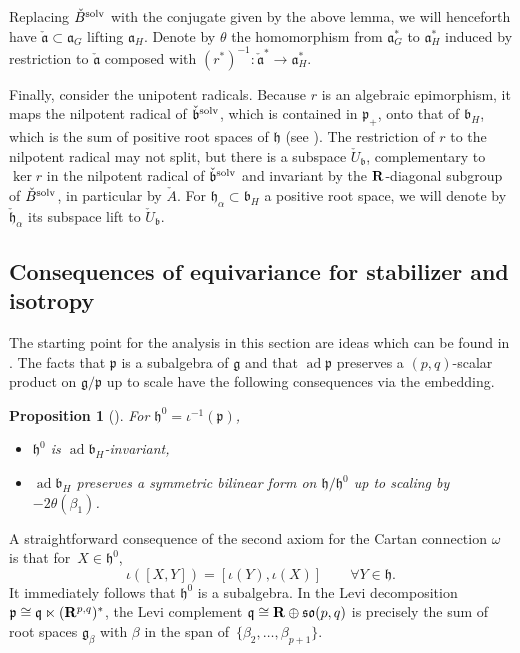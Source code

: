 \documentclass[pdftex]{sigma}
\numberwithin{equation}{section}
\newtheorem{prop}[thm]{Proposition}
\theoremstyle{definition}
\newcommand{\BR}{{\bf R}}
\newcommand{\lieg}{\mathfrak{g}}
\newcommand{\lieh}{\mathfrak{h}}
\def\p{{\mathfrak p}}
\def\q{{\mathfrak q}}
\def\a{{\mathfrak a}}
\def\b{{\mathfrak b}}
\newcommand{\so}{\mathfrak{so}}
\newcommand{\ad}{\operatorname{ad}}
\begin{document}
 Replacing $\check{B}^{\rm solv}$ with the conjugate given by the above lemma, we will henceforth have $\check{\a} \subset \a_G$ lifting $\a_H$. Denote by $\theta$ the homomorphism from $\a_G^*$ to $\a_H^*$ induced by restriction to $\check{\a}$ composed with $(r^*)^{-1}\colon \check{\a}^* \rightarrow \a_H^*$.


Finally, consider the unipotent radicals.
Because $r$ is an algebraic epimorphism, it maps the nilpotent radical of $\check{\b}^{\rm solv}$, which is contained in $\p_+$, onto that of $\b_H$, which is the sum of positive root spaces of $\lieh$ (see \cite[Corollary 4.3.6]{morris.ratners.thms.book}). The restriction of $r$ to the nilpotent radical may not split,
but there is a subspace $\check{U}_{\b}$,
complementary to $\ker r$ in the nilpotent radical of $\check{\b}^{\rm solv}$ and invariant by the $\BR$-diagonal subgroup of $\check{B}^{\rm solv}$, in particular by $\check{A}$. For $\lieh_\alpha \subset \b_H$ a positive root space, we will denote by $\check{\lieh}_\alpha$ its subspace lift to $\check{U}_\b$.


\subsection{Consequences of equivariance for stabilizer and isotropy}
\label{subsec.consequences.stab.iso}

The starting point for the analysis in this section are ideas which can be found in \cite{pecastaing.rank1}.
The facts that $\p$ is a subalgebra of $\lieg$ and that $\ad \p$ preserves a $(p,q)$-scalar product on $\lieg/\p$ up to scale have the following consequences via the embedding.

\begin{prop}[{\cite[Proposition~2.1]{pecastaing.rank1}}]\label{prop.vincent}
For $\lieh^0 = \iota^{-1}(\p)$,
\begin{itemize}\itemsep=0pt
\item[$(1)$] $\lieh^0$ is $\ad \b_H$-invariant,
\item[$(2)$] $\ad \b_H$ preserves a symmetric bilinear form on $\lieh/\lieh^0$ up to scaling by $- 2 \theta(\beta_1)$.
\end{itemize}
\end{prop}


A straightforward consequence of the second axiom for the Cartan connection $\omega$ is that for~${X \in \lieh^0}$,
\begin{equation}
\label{eqn.iota.in.p}
 \iota ( [X,Y] ) = [\iota(Y),\iota(X)] \qquad \forall Y \in \lieh.
 \end{equation}
 It immediately follows that $\lieh^0$ is a subalgebra. In the Levi decomposition $\p \cong \q \ltimes (\BR^{p,q})^*$, the Levi complement $\q \cong \BR \oplus \so(p,q)$ is precisely the sum of root spaces $\lieg_\beta$ with $\beta$ in the span of~$\{ \beta_2, \dots, \beta_{p+1} \}$.
\end{document}
